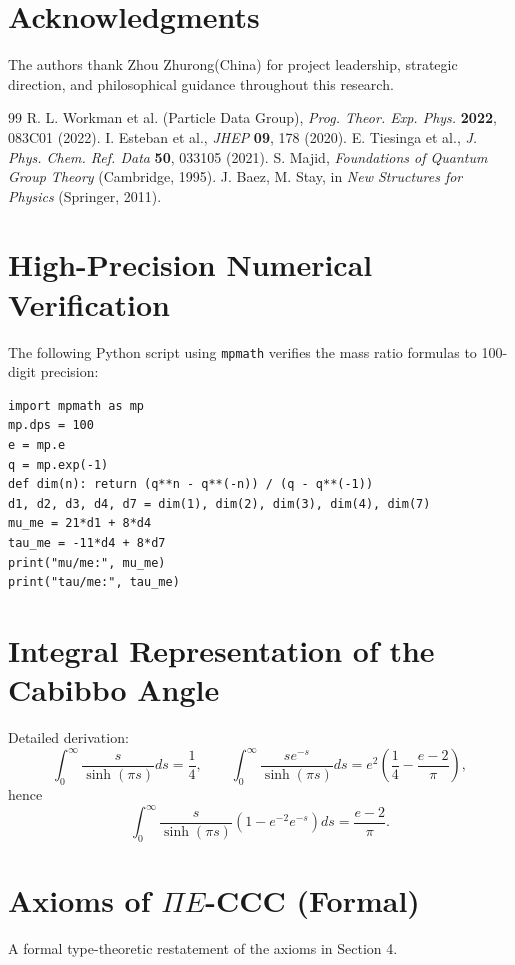 ﻿\documentclass[twocolumn]{article}
\begin{document}
\section*{Acknowledgments}
The authors thank Zhou Zhurong(China) for project leadership, strategic direction, and philosophical guidance throughout this research.

\begin{thebibliography}{99}
 R. L. Workman et al. (Particle Data Group), \textit{Prog. Theor. Exp. Phys.} \textbf{2022}, 083C01 (2022).
 I. Esteban et al., \textit{JHEP} \textbf{09}, 178 (2020).
 E. Tiesinga et al., \textit{J. Phys. Chem. Ref. Data} \textbf{50}, 033105 (2021).
 S. Majid, \textit{Foundations of Quantum Group Theory} (Cambridge, 1995).
 J. Baez, M. Stay, in \textit{New Structures for Physics} (Springer, 2011).
\end{thebibliography}

\appendix
\section{High-Precision Numerical Verification}
The following Python script using \texttt{mpmath} verifies the mass ratio formulas to 100-digit precision:
\begin{verbatim}
import mpmath as mp
mp.dps = 100
e = mp.e
q = mp.exp(-1)
def dim(n): return (q**n - q**(-n)) / (q - q**(-1))
d1, d2, d3, d4, d7 = dim(1), dim(2), dim(3), dim(4), dim(7)
mu_me = 21*d1 + 8*d4
tau_me = -11*d4 + 8*d7
print("mu/me:", mu_me)
print("tau/me:", tau_me)
\end{verbatim}

\section{Integral Representation of the Cabibbo Angle}
Detailed derivation:
\[
\int_0^\infty \frac{s}{\sinh(\pi s)}ds = \frac14,\qquad 
\int_0^\infty \frac{s e^{-s}}{\sinh(\pi s)}ds = e^2\left(\frac14 - \frac{e-2}{\pi}\right),
\]
hence
\[
\int_0^\infty \frac{s}{\sinh(\pi s)}(1 - e^{-2}e^{-s})ds = \frac{e-2}{\pi}.
\]

\section{Axioms of \(\Pi E\)-CCC (Formal)}
A formal type-theoretic restatement of the axioms in Section 4.
\end{document}
